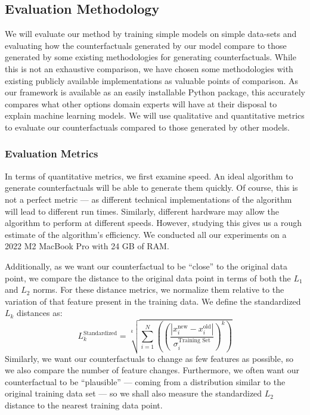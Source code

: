 \documentclass{article}
\begin{document}
\subsection{Evaluation Methodology}
We will evaluate our method by training simple models on simple data-sets and evaluating how the counterfactuals generated by our model compare to those generated by some existing methodologies for generating counterfactuals. While this is not an exhaustive comparison, we have chosen some methodologies with existing publicly available implementations as valuable points of comparison. As our framework is available as an easily installable Python package, this accurately compares what other options domain experts will have at their disposal to explain machine learning models. We will use qualitative and quantitative metrics to evaluate our counterfactuals compared to those generated by other models. 


\subsubsection{Evaluation Metrics\label{section:evaluation_metrics}}
In terms of quantitative metrics, we first examine speed. An ideal algorithm to generate counterfactuals will be able to generate them quickly. Of course, this is not a perfect metric --- as different technical implementations of the algorithm will lead to different run times. Similarly, different hardware may allow the algorithm to perform at different speeds. However, studying this gives us a rough estimate of the algorithm's efficiency. We conducted all our experiments on a 2022 M2 MacBook Pro with 24 GB of RAM. %

Additionally, as we want our counterfactual to be ``close'' to the original data point, we compare the distance to the original data point in terms of both the \(L_1\) and \(L_2\) norms. For these distance metrics, we normalize them relative to the variation of that feature present in the training data. We define the standardized \(L_k\) distances as:   
\begin{equation}
    L_k^{\text{Standardized}} = \sqrt[k]{\sum_{i=1}^N \left(\left( \frac{\left|x^{\text{new}}_i - x^{\text{old}}_i \right|}{\sigma_i^\text{Training Set}}\right)^k\right)} %
\end{equation}
Similarly, we want our counterfactuals to change as few features as possible, so we also compare the number of feature changes. Furthermore, we often want our counterfactual to be ``plausible'' --- coming from a distribution similar to the original training data set --- so we shall also measure the standardized \(L_2\) distance to the nearest training data point.
\end{document}
